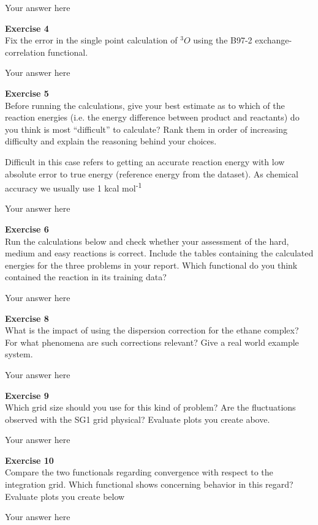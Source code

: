 \documentclass{article}
\begin{document}
Your answer here

\begin{mdframed}
\textbf{Exercise 4}\\
Fix the error in the single point calculation of  $^3 O$ using the B97-2 exchange-correlation functional.
\end{mdframed}

Your answer here

\begin{mdframed}
\textbf{Exercise 5}\\
Before running the calculations, give your best estimate as to which of the reaction energies (i.e. the energy difference between product and reactants) do you think is most ``difficult'' to calculate? Rank them in order of increasing difficulty and explain the reasoning behind your choices.

Difficult in this case refers to getting an accurate reaction energy with low absolute error to true energy (reference energy from the dataset). As chemical accuracy we usually use 1 kcal mol\textsuperscript{-1}
\end{mdframed}

Your answer here

\begin{mdframed}
\textbf{Exercise 6}\\
Run the calculations below and check whether your assessment of the hard, medium and easy reactions is correct. Include the tables containing the calculated energies for the three problems in your report. Which functional do you think contained the reaction in its training data?
\end{mdframed}

Your answer here

\begin{mdframed}
\textbf{Exercise 8}\\
What is the impact of using the dispersion correction for the ethane complex? For what phenomena are such corrections relevant? Give a real world example system.
\end{mdframed}

Your answer here

\begin{mdframed}
\textbf{Exercise 9}\\
Which grid size should you use for this kind of problem? Are the fluctuations observed with the SG1 grid physical? Evaluate plots you create above.
\end{mdframed}

Your answer here

\begin{mdframed}
\textbf{Exercise 10}\\
Compare the two functionals regarding convergence with respect to the integration grid. Which functional shows concerning behavior in this regard? Evaluate plots you create below
\end{mdframed}

Your answer here



\clearpage
\end{document}
